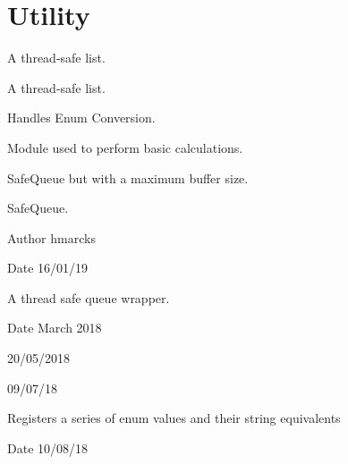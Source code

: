 \hypertarget{group__Utility}{}\section{Utility}
\label{group__Utility}


A thread-\/safe list.  


A thread-\/safe list. 

Handles Enum Conversion.

Module used to perform basic calculations.

Safe\+Queue but with a maximum buffer size.

Safe\+Queue.

\begin{DoxyAuthor}{Author}
hmarcks
\end{DoxyAuthor}
\begin{DoxyDate}{Date}
16/01/19
\end{DoxyDate}
A thread safe queue wrapper.

\begin{DoxyDate}{Date}
March 2018

20/05/2018

09/07/18
\end{DoxyDate}
Registers a series of enum values and their string equivalents

\begin{DoxyDate}{Date}
10/08/18 
\end{DoxyDate}
